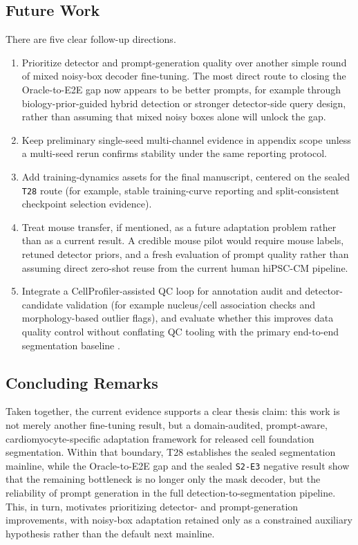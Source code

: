 \subsection{Future Work}\label{future-work}

There are five clear follow-up directions.

\begin{enumerate}
\def\labelenumi{\arabic{enumi}.}
\tightlist
\item
  Prioritize detector and prompt-generation quality over another simple round of mixed noisy-box decoder fine-tuning. The most direct route to closing the Oracle-to-E2E gap now appears to be better prompts, for example through biology-prior-guided hybrid detection or stronger detector-side query design, rather than assuming that mixed noisy boxes alone will unlock the gap.
\item
  Keep preliminary single-seed multi-channel evidence in appendix scope unless a multi-seed rerun confirms stability under the same reporting protocol.
\item
  Add training-dynamics assets for the final manuscript, centered on the sealed \texttt{T28} route (for example, stable training-curve reporting and split-consistent checkpoint selection evidence).
\item
  Treat mouse transfer, if mentioned, as a future adaptation problem rather than as a current result. A credible mouse pilot would require mouse labels, retuned detector priors, and a fresh evaluation of prompt quality rather than assuming direct zero-shot reuse from the current human hiPSC-CM pipeline.
\item
  Integrate a CellProfiler-assisted QC loop for annotation audit and detector-candidate validation (for example nucleus/cell association checks and morphology-based outlier flags), and evaluate whether this improves data quality control without conflating QC tooling with the primary end-to-end segmentation baseline \cite{carpenter2006cellprofiler,mcquin2018cellprofiler3}.
\end{enumerate}

\subsection{Concluding Remarks}\label{concluding-remarks}

Taken together, the current evidence supports a clear thesis claim: this work is not merely another fine-tuning result, but a domain-audited, prompt-aware, cardiomyocyte-specific adaptation framework for released cell foundation segmentation. Within that boundary, T28 establishes the sealed segmentation mainline, while the Oracle-to-E2E gap and the sealed \texttt{S2-E3} negative result show that the remaining bottleneck is no longer only the mask decoder, but the reliability of prompt generation in the full detection-to-segmentation pipeline. This, in turn, motivates prioritizing detector- and prompt-generation improvements, with noisy-box adaptation retained only as a constrained auxiliary hypothesis rather than the default next mainline.
